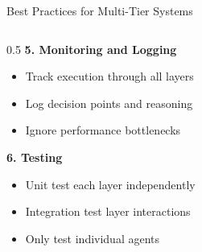\documentclass[aspectratio=169,11pt]{beamer}
\begin{document}
\begin{frame}{Best Practices for Multi-Tier Systems}
\begin{columns}[T]
\begin{column}{0.5\textwidth}
            \vspace{0.2cm}
            \textbf{5. Monitoring and Logging}
            \begin{itemize}
                \item[\checkmark] Track execution through all layers
                \item[\checkmark] Log decision points and reasoning
                \item[$\times$] Ignore performance bottlenecks
            \end{itemize}

            \vspace{0.2cm}
            \textbf{6. Testing}
            \begin{itemize}
                \item[\checkmark] Unit test each layer independently
                \item[\checkmark] Integration test layer interactions
                \item[$\times$] Only test individual agents
            \end{itemize}
        \end{column}
    \end{columns}
\end{frame}
\end{document}
